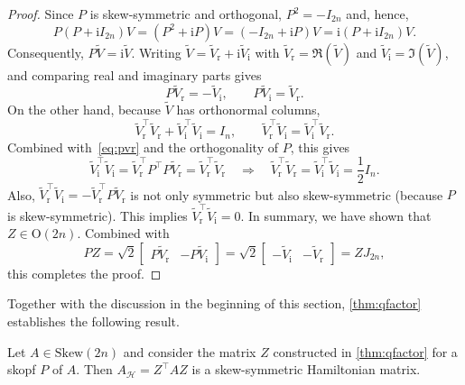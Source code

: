 \documentclass[final,onefignum,onetabnum,dvipsnames]{siamart251216}
\numberwithin{algorithm}{section}
\numberwithin{equation}{section}
\begin{document}
\begin{proof}
Since $P$ is skew-symmetric and orthogonal, 
$P^2=-I_{2n}$ and, hence, 
\[  
    P(P+\mathrm{i}I_{2n})V
    =(P^2+\mathrm{i}P)V
    =(-I_{2n}+\mathrm{i}P)V
    =\mathrm{i}(P+\mathrm{i}I_{2n})V.
\]
Consequently,
$
    P\widetilde V=\mathrm{i}\widetilde V.
$
Writing $\widetilde V=\widetilde{V}_\mathrm{r}+\mathrm{i}\widetilde{V}_\mathrm{i}$ with $\widetilde{V}_\mathrm{r} = \Re(\widetilde V)$ and 
$\widetilde{V}_\mathrm{i} = \Im(\widetilde V)$, and comparing real and imaginary
parts gives
\begin{equation} \label{eq:pvr}
     P\widetilde{V}_\mathrm{r} =-\widetilde{V}_\mathrm{i},
    \qquad
    P\widetilde{V}_\mathrm{i} = \widetilde{V}_\mathrm{r}.
\end{equation}
On the other hand, because $\widetilde V$ has orthonormal columns,
\[
    \widetilde{V}_\mathrm{r}^\top \widetilde{V}_\mathrm{r}+\widetilde{V}_\mathrm{i}^\top \widetilde{V}_\mathrm{i}=I_n,
    \qquad
    \widetilde{V}_\mathrm{r}^\top \widetilde{V}_\mathrm{i} = \widetilde{V}_\mathrm{i}^\top \widetilde{V}_\mathrm{r}.
\]
Combined with~\eqref{eq:pvr} and the orthogonality of $P$, this gives
\[
    \widetilde{V}_\mathrm{i}^\top \widetilde{V}_\mathrm{i}=\widetilde{V}_\mathrm{r}^\top P^\top P \widetilde{V}_\mathrm{r}=\widetilde{V}_\mathrm{r}^\top \widetilde{V}_\mathrm{r} \quad \Longrightarrow \quad \widetilde{V}_\mathrm{r}^\top \widetilde{V}_\mathrm{r} = \widetilde{V}_\mathrm{i}^\top \widetilde{V}_\mathrm{i} = \frac12 I_n.
\]
Also, $\widetilde{V}_\mathrm{r}^\top \widetilde{V}_\mathrm{i}=-\widetilde{V}_\mathrm{r}^\top P \widetilde{V}_\mathrm{r}$ is not only symmetric but also skew-symmetric (because $P$ is skew-symmetric). This implies 
$\widetilde{V}_\mathrm{r}^\top \widetilde{V}_\mathrm{i}=0$. In summary, we have shown that $Z\in\mathrm{O}(2n)$.
Combined with
\[
    PZ
    =\sqrt{2}\begin{bmatrix}P \widetilde{V}_\mathrm{r}&-P \widetilde{V}_\mathrm{i}\end{bmatrix}
    =\sqrt{2}\begin{bmatrix}-\widetilde{V}_\mathrm{i}&-\widetilde{V}_\mathrm{r} \end{bmatrix}
    =ZJ_{2n},
\]
this completes the proof.
\end{proof}

Together with the discussion in the beginning of this section, \cref{thm:qfactor} establishes the following result.
\begin{corollary} \label{thm:polar_rsd}
Let $A\in\mathrm{Skew}(2n)$ and consider the matrix $Z$ constructed in \cref{thm:qfactor} for a skopf $P$ of $A$. Then 
$A_\mathcal{H} = Z^\top A Z$ is a skew-symmetric Hamiltonian matrix.
\end{corollary}
\end{document}
